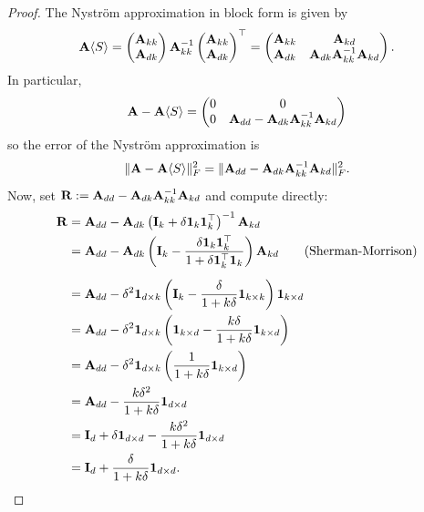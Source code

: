 \begin{proof}
\vspace{1em}
The Nystr\"om approximation in block form is given by
\[\mathbf{A}\langle S\rangle = \begin{pmatrix}
    \mathbf{A}_{kk}\\
    \mathbf{A}_{dk}
\end{pmatrix} \mathbf{A}_{kk}^{-1}\begin{pmatrix}
    \mathbf{A}_{kk}\\
    \mathbf{A}_{dk}
\end{pmatrix}^\top = \begin{pmatrix}
    \mathbf{A}_{kk} & \mathbf{A}_{kd}\\
    \mathbf{A}_{dk} & \mathbf{A}_{dk}\mathbf{A}_{kk}^{-1}\mathbf{A}_{kd}
\end{pmatrix}.\]
In particular,
\[\mathbf{A} - \mathbf{A}\langle S\rangle = \begin{pmatrix}
    0 & 0\\
    0 & \mathbf{A}_{dd} - \mathbf{A}_{dk}\mathbf{A}_{kk}^{-1}\mathbf{A}_{kd}
\end{pmatrix}\]
so the error of the Nystr\"om approximation is
\[\|\mathbf{A} - \mathbf{A}\langle S\rangle\|^2_F = \|\mathbf{A}_{dd} - \mathbf{A}_{dk}\mathbf{A}_{kk}^{-1}\mathbf{A}_{kd}\|^2_F.\]
Now, set $\mathbf{R} := \mathbf{A}_{dd} - \mathbf{A}_{dk}\mathbf{A}_{kk}^{-1}\mathbf{A}_{kd}$ and compute directly:
\begin{align*}
    \mathbf{R} &= \mathbf{A}_{dd}- \mathbf{A}_{dk}\left(\mathbf{I}_k + \delta \mathbf{1}_k\mathbf{1}_k^\top\right)^{-1}\mathbf{A}_{kd}\\
    &=\mathbf{A}_{dd}- \mathbf{A}_{dk}\left(\mathbf{I}_k - \frac{\delta \mathbf{1}_k\mathbf{1}_k^\top}{1+\delta \mathbf{1}_k^\top\mathbf{1}_k}\right)\mathbf{A}_{kd}\qquad\text{(Sherman-Morrison)}\\[5pt]
    &=\mathbf{A}_{dd}-\delta^2 \mathbf{1}_{d\times k}\left(\mathbf{I}_k - \frac{\delta }{1+k\delta}\mathbf{1}_{k\times k}\right)\mathbf{1}_{k\times d}\\
    &=\mathbf{A}_{dd}-\delta^2 \mathbf{1}_{d\times k}\left(\mathbf{1}_{k\times d} - \frac{k\delta}{1+k\delta}\mathbf{1}_{k\times d}\right)\\
    &=\mathbf{A}_{dd}-\delta^2 \mathbf{1}_{d\times k}\left(\frac{1}{1+k\delta}\mathbf{1}_{k\times d}\right)\\
    &=\mathbf{A}_{dd} - \frac{k\delta^2}{1+k\delta}\mathbf{1}_{d\times d}\\
    &= \mathbf{I}_d + \delta\mathbf{1}_{d\times d} - \frac{k\delta^2}{1+k\delta}\mathbf{1}_{d\times d}\\
    &= \mathbf{I}_d + \frac{\delta}{1+k\delta}\mathbf{1}_{d\times d}.\\
\end{align*}


\end{proof}
